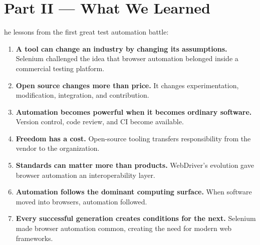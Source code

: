 \documentclass[11pt, a4paper, openany]{book}
\newcommand{\initialcap}[1]{{\fontfamily{lmss}\selectfont\huge\textbf{#1}}}
\begin{document}
\chapter*{Part II --- What We Learned}

\noindent \initialcap{T}he lessons from the first great test automation battle:
\begin{enumerate}
    \item \textbf{A tool can change an industry by changing its assumptions.} Selenium challenged the idea that browser automation belonged inside a commercial testing platform.
    \item \textbf{Open source changes more than price.} It changes experimentation, modification, integration, and contribution.
    \item \textbf{Automation becomes powerful when it becomes ordinary software.} Version control, code review, and CI become available.
    \item \textbf{Freedom has a cost.} Open-source tooling transfers responsibility from the vendor to the organization.
    \item \textbf{Standards can matter more than products.} WebDriver's evolution gave browser automation an interoperability layer.
    \item \textbf{Automation follows the dominant computing surface.} When software moved into browsers, automation followed.
    \item \textbf{Every successful generation creates conditions for the next.} Selenium made browser automation common, creating the need for modern web frameworks.
\end{enumerate}
\end{document}

